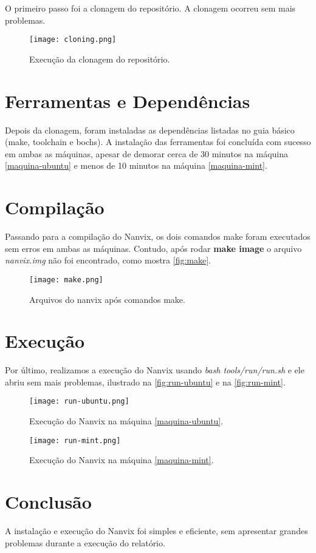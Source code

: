 \documentclass[12pt,
    oneside,
    brazil,
    sumario=tradicional,
    article,
    a4paper
]{abntex2}
\begin{document}
    O primeiro passo foi a clonagem do repositório. A clonagem ocorreu sem mais problemas.
    
    \begin{figure}[!htb]
        \centering
        \texttt{[image: cloning.png]}
        \caption{Execução da clonagem do repositório.}
        \label{fig:cloning}
    \end{figure}
    
    \section{Ferramentas e Dependências}

    Depois da clonagem, foram instaladas as dependências listadas no guia básico (make, toolchain e bochs).
    A instalação das ferramentas foi concluída com sucesso em ambas as máquinas, apesar de demorar cerca de 30 minutos na máquina \ref{maquina-ubuntu} e menos de 10 minutos na máquina \ref{maquina-mint}.

    \section{Compilação}\label{sec:compilacao}

    Passando para a compilação do Nanvix, os dois comandos make foram executados sem erros em ambas as máquinas.
    Contudo, após rodar \textbf{make image} o arquivo \textit{nanvix.img} não foi encontrado, como mostra \autoref{fig:make}.

    \begin{figure}[!htb]
        \centering
        \texttt{[image: make.png]}
        \caption{Arquivos do nanvix após comandos make.}
        \label{fig:make}
    \end{figure}

    \section{Execução}\label{sec:execucao}

    Por último, realizamos a execução do Nanvix usando \textit{bash tools/run/run.sh} e ele abriu sem mais problemas, ilustrado na \autoref{fig:run-ubuntu} e na \autoref{fig:run-mint}.

    \begin{figure}[!htb]
        \centering
        \texttt{[image: run-ubuntu.png]}
        \caption{Execução do Nanvix na máquina \ref{maquina-ubuntu}.}
        \label{fig:run-ubuntu}
    \end{figure}

    \begin{figure}[!htb]
        \centering
        \texttt{[image: run-mint.png]}
        \caption{Execução do Nanvix na máquina \ref{maquina-mint}.}
        \label{fig:run-mint}
    \end{figure}

    \section{Conclusão}\label{conclusao}

    A instalação e execução do Nanvix foi simples e eficiente, sem apresentar grandes problemas durante a execução do relatório.
\end{document}
